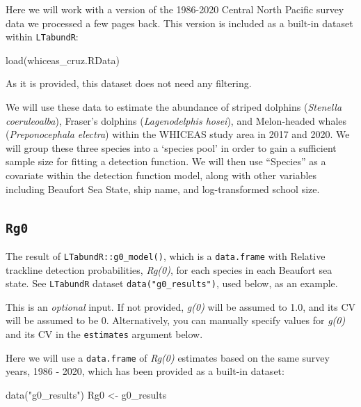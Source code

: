 \documentclass[
]{book}
\newenvironment{Shaded}{\begin{snugshade}}{\end{snugshade}}
\newcommand{\FunctionTok}[1]{\textcolor[rgb]{0.00,0.00,0.00}{#1}}
\newcommand{\NormalTok}[1]{#1}
\newcommand{\OtherTok}[1]{\textcolor[rgb]{0.56,0.35,0.01}{#1}}
\newcommand{\StringTok}[1]{\textcolor[rgb]{0.31,0.60,0.02}{#1}}
\begin{document}
Here we will work with a version of the 1986-2020 Central North Pacific survey data we processed a few pages back. This version is included as a built-in dataset within \texttt{LTabundR}:

\begin{Shaded}
\begin{Highlighting}[]
\FunctionTok{load}\NormalTok{(}\StringTok{\textquotesingle{}whiceas\_cruz.RData\textquotesingle{}}\NormalTok{)}
\end{Highlighting}
\end{Shaded}

As it is provided, this dataset does not need any filtering.

We will use these data to estimate the abundance of striped dolphins (\emph{Stenella coeruleoalba}), Fraser's dolphins (\emph{Lagenodelphis hosei}), and Melon-headed whales (\emph{Preponocephala electra}) within the WHICEAS study area in 2017 and 2020. We will group these three species into a `species pool' in order to gain a sufficient sample size for fitting a detection function. We will then use ``Species'' as a covariate within the detection function model, along with other variables including Beaufort Sea State, ship name, and log-transformed school size.

\hypertarget{rg0}{%
\subsection*{\texorpdfstring{\texttt{Rg0}}{Rg0}}\label{rg0}}

The result of \texttt{LTabundR::g0\_model()}, which is a \texttt{data.frame} with Relative trackline detection probabilities, \emph{Rg(0)}, for each species in each Beaufort sea state. See \texttt{LTabundR} dataset \texttt{data("g0\_results")}, used below, as an example.

This is an \emph{optional} input. If not provided, \emph{g(0)} will be assumed to 1.0, and its CV will be assumed to be 0. Alternatively, you can manually specify values for \emph{g(0)} and its CV in the \texttt{estimates} argument below.

Here we will use a \texttt{data.frame} of \emph{Rg(0)} estimates based on the same survey years, 1986 - 2020, which has been provided as a built-in dataset:

\begin{Shaded}
\begin{Highlighting}[]
\FunctionTok{data}\NormalTok{(}\StringTok{"g0\_results"}\NormalTok{)}
\NormalTok{Rg0 }\OtherTok{\textless{}{-}}\NormalTok{ g0\_results}
\end{Highlighting}
\end{Shaded}
\end{document}
